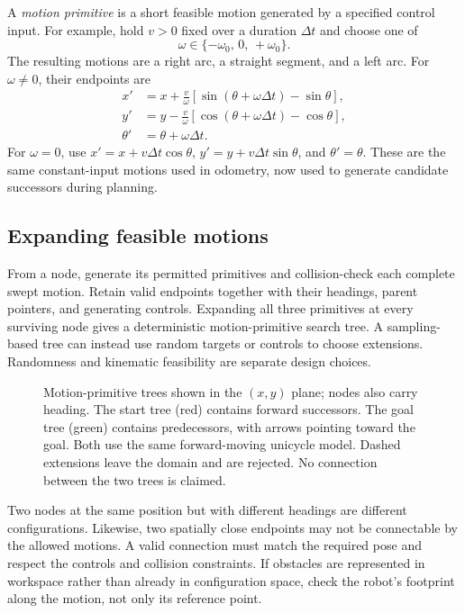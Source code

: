 A \emph{motion primitive} is a short feasible motion generated by a
specified control input. For example, hold $v>0$ fixed over a duration
$\Delta t$ and choose one of
\[
 \omega\in\{-\omega_0,\,0,\,+\omega_0\}.
\]
The resulting motions are a right arc, a straight segment, and a left arc.
For $\omega\ne0$, their endpoints are
\begin{align*}
 x'&=x+\frac{v}{\omega}
       [\sin(\theta+\omega\Delta t)-\sin\theta],\\
 y'&=y-\frac{v}{\omega}
       [\cos(\theta+\omega\Delta t)-\cos\theta],\\
 \theta'&=\theta+\omega\Delta t.
\end{align*}
For $\omega=0$, use $x'=x+v\Delta t\cos\theta$,
$y'=y+v\Delta t\sin\theta$, and $\theta'=\theta$.
These are the same constant-input motions used in odometry, now used
to generate candidate successors during planning.

\subsection{Expanding feasible motions}
From a node, generate its permitted primitives and collision-check each
complete swept motion. Retain valid endpoints together with their headings,
parent pointers, and generating controls. Expanding all three primitives
at every surviving node gives a deterministic motion-primitive search
tree. A sampling-based tree can instead use random targets or controls
to choose extensions. Randomness and kinematic feasibility are separate
design choices.

\begin{figure}[htbp]
\centering
\caption{Motion-primitive trees shown in the $(x,y)$ plane; nodes also
carry heading. The start tree (red) contains forward successors. The
goal tree (green) contains predecessors, with arrows pointing toward
the goal. Both use the same forward-moving unicycle model. Dashed
extensions leave the domain and are rejected. No connection between
the two trees is claimed.}
\label{fig:l13-primitives}
\end{figure}

Two nodes at the same position but with different headings are different
configurations. Likewise, two spatially close endpoints may not be
connectable by the allowed motions. A valid connection must match the
required pose and respect the controls and collision constraints. If
obstacles are represented in workspace rather than already in configuration
space, check the robot's footprint along the motion, not only its reference
point.

